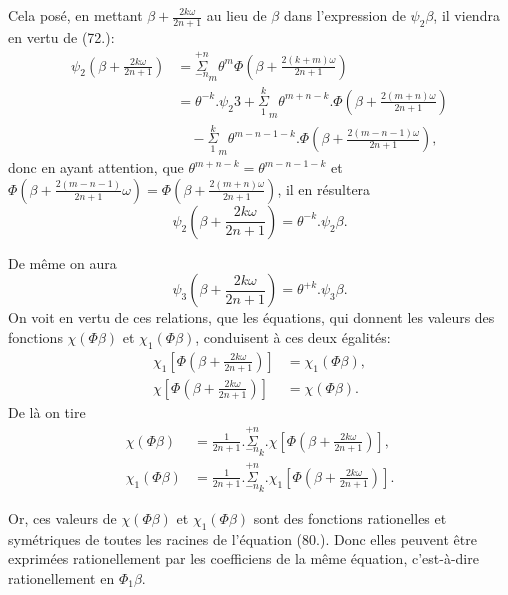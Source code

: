 \documentclass{article}
\begin{document}
Cela posé, en mettant $\beta+\frac{2k\omega}{2n+1}$ au lieu de $\beta$ dans l'expression de $\psi_{2}\beta$, il viendra en vertu de (72.):
\[ \begin{aligned}
\psi_{2}\left(\beta+\frac{2k\omega}{2n+1}\right)&=\overset{+n}{\underset{-n}{\Sigma}}_{m}\theta^{m}\Phi\left(\beta+\frac{2(k+m)\omega}{2n+1}\right)\\
&=\theta^{-k}.\psi_{2}3+\overset{k}{\underset{1}{\Sigma}}_{m}\theta^{m+n-k}.\Phi\left(\beta+\frac{2(m+n)\omega}{2n+1}\right)\\
&\quad-\overset{k}{\underset{1}{\Sigma}}_{m}\theta^{m-n-1-k}.\Phi\left(\beta+\frac{2(m-n-1)\omega}{2n+1}\right),
\end{aligned} \]
donc en ayant attention, que $\theta^{m+n-k}=\theta^{m-n-1-k}$ et $\Phi\left(\beta+\frac{2(m-n-1)}{2n+1}\omega\right)=\Phi\left(\beta+\frac{2(m+n)\omega}{2n+1}\right)$, il en résultera
\[ \psi_{2}\left(\beta+\frac{2k\omega}{2n+1}\right)=\theta^{-k}.\psi_{2}\beta. \tag{81.} \]

De même on aura
\[ \psi_{3}\left(\beta+\frac{2k\omega}{2n+1}\right)=\theta^{+k}.\psi_{3}\beta. \]
On voit en vertu de ces relations, que les équations, qui donnent les valeurs des fonctions $\chi(\Phi\beta)$ et $\chi_{1}(\Phi\beta)$, conduisent à ces deux égalités:
\[ \begin{aligned}
\chi_{1}\left[\Phi\left(\beta+\frac{2k\omega}{2n+1}\right)\right]&=\chi_{1}(\Phi\beta),\\
\chi\left[\Phi\left(\beta+\frac{2k\omega}{2n+1}\right)\right]&=\chi(\Phi\beta).
\end{aligned} \]
De là on tire
\[ \begin{aligned}
\chi(\Phi\beta)&=\frac{1}{2n+1}.\overset{+n}{\underset{-n}{\Sigma}}_{k}.\chi\left[\Phi\left(\beta+\frac{2k\omega}{2n+1}\right)\right],\\
\chi_{1}(\Phi\beta)&=\frac{1}{2n+1}.\overset{+n}{\underset{-n}{\Sigma}}_{k}.\chi_{1}\left[\Phi\left(\beta+\frac{2k\omega}{2n+1}\right)\right].
\end{aligned} \]

Or, ces valeurs de $\chi(\Phi\beta)$ et $\chi_{1}(\Phi\beta)$ sont des fonctions rationelles et symétriques de toutes les racines de l'équation (80.). Donc elles peuvent être exprimées rationellement par les coefficiens de la même équation, c'est-à-dire rationellement en $\Phi_{1}\beta$.
\end{document}

